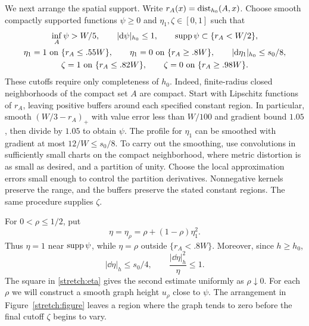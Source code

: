 We next arrange the spatial support.  Write
$r_A(x)=\operatorname{dist}_{h_0}(A,x)$.  Choose smooth compactly supported functions
$\psi\ge0$ and $\eta_1,\zeta\in[0,1]$ such that
\begin{equation}\label{stretch:cutoffs}
 \begin{gathered}
 \inf_A\psi>W/5,\qquad |\mathrm d\psi|_{h_0}\le1,
       \qquad \operatorname{supp}\psi\subset\{r_A<W/2\},\\
 \eta_1=1\text{ on }\{r_A\le.55W\},\qquad
 \eta_1=0\text{ on }\{r_A\ge.8W\},
       \qquad |\mathrm d\eta_1|_{h_0}\le s_0/8,\\
 \zeta=1\text{ on }\{r_A\le.82W\},\qquad
 \zeta=0\text{ on }\{r_A\ge.98W\}.
 \end{gathered}
\end{equation}
These cutoffs require only completeness of $h_0$.  Indeed, finite-radius
closed neighborhoods of the compact set $A$ are compact.  Start with
Lipschitz functions of $r_A$, leaving positive buffers around each
specified constant region.  In particular, smooth
$(W/3-r_A)_+$ with value error less than $W/100$ and gradient bound
$1.05$, then divide by $1.05$ to obtain $\psi$.  The profile for $\eta_1$
can be smoothed with gradient at most $12/W\le s_0/8$.
To carry out the smoothing, use convolutions in sufficiently small charts
on the compact neighborhood, where metric distortion is as small as
desired, and a partition of unity.  Choose the local approximation errors
small enough to control the partition derivatives.  Nonnegative kernels
preserve the range, and the buffers preserve the stated constant regions.
The same procedure supplies $\zeta$.

For $0<\rho\le1/2$, put
\begin{equation}\label{stretch:eta}
 \eta=\eta_\rho=\rho+(1-\rho)\eta_1^2.
\end{equation}
Thus $\eta=1$ near $\operatorname{supp}\psi$, while $\eta=\rho$ outside
$\{r_A<.8W\}$.  Moreover, since $h\ge h_0$,
\begin{equation}\label{stretch:eta-bounds}
 |\dd\eta|_h\le s_0/4,\qquad
 \frac{|\dd\eta|_h^2}{\eta}\le1.
\end{equation}
The square in \eqref{stretch:eta} gives the second estimate uniformly
as $\rho\downarrow0$.  For each $\rho$ we will construct a smooth graph
height $u_\rho$ close to $\psi$.  The arrangement in Figure~\ref{stretch:figure}
leaves a region where the graph tends to zero before the final cutoff
$\zeta$ begins to vary.

